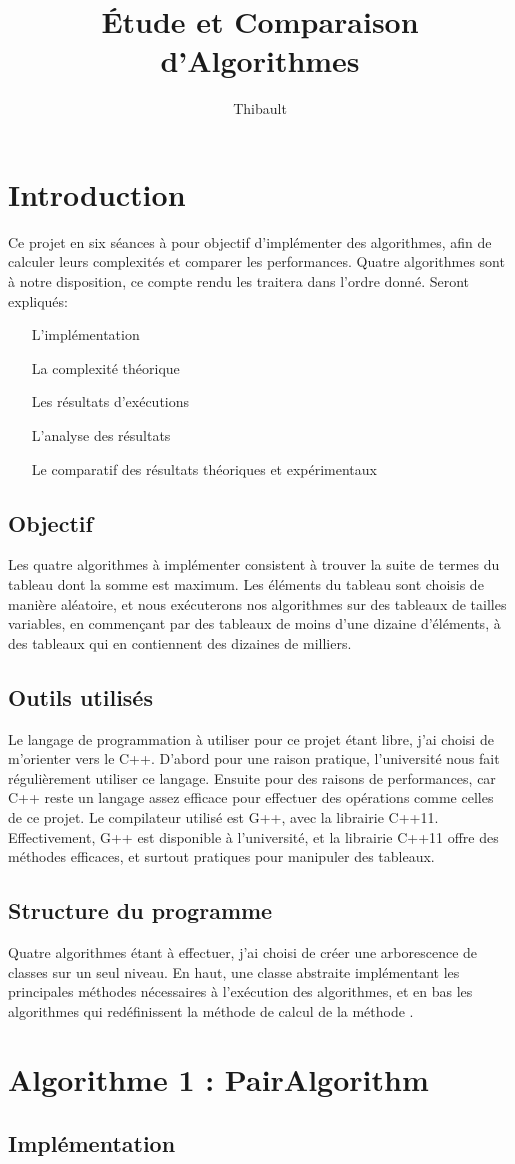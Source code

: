 \documentclass[a4paper, 12pt]{article}
\author{Thibault \bsc{BEZIERS LA FOSSE}}
\date{}
\title{Étude et Comparaison d'Algorithmes}
\begin{document}
\maketitle
\clearpage

\tableofcontents
\clearpage

\section{Introduction}
Ce projet en six séances à pour objectif d'implémenter des algorithmes, afin de calculer leurs complexités et comparer les performances. 
Quatre algorithmes sont à notre disposition, ce compte rendu les traitera dans l'ordre donné. Seront expliqués:
\begin{enumerate}
\item[L'implémentation]
\item[La complexité théorique]
\item[Les résultats d'exécutions]
\item[L'analyse des résultats]
\item[Le comparatif des résultats théoriques et expérimentaux]
\end{enumerate}
\subsection{Objectif}
Les quatre algorithmes à implémenter consistent à trouver la suite de termes du tableau dont la somme est maximum. 
Les éléments du tableau sont choisis de manière aléatoire, et nous exécuterons nos algorithmes sur des tableaux de tailles variables, en commençant par des tableaux de moins d'une dizaine d'éléments, à des tableaux qui en contiennent des dizaines de milliers.  
\subsection{Outils utilisés}
Le langage de programmation à utiliser pour ce projet étant libre, j'ai choisi de m'orienter vers le C++. D'abord pour une raison pratique, l'université nous fait régulièrement utiliser ce langage. Ensuite pour des raisons de performances, car C++ reste un langage assez efficace pour effectuer des opérations comme celles de ce projet.
Le compilateur utilisé est G++, avec la librairie C++11. Effectivement, G++ est disponible à l'université, et la librairie C++11 offre des méthodes efficaces, et surtout pratiques pour manipuler des tableaux. 
\subsection{Structure du programme}
Quatre algorithmes étant à effectuer, j'ai choisi de créer une arborescence de classes sur un seul niveau. En haut, une classe abstraite implémentant les principales méthodes nécessaires à l’exécution des algorithmes, et en bas les algorithmes qui redéfinissent la méthode de calcul de la méthode .
\section{Algorithme 1 : PairAlgorithm}
\subsection{Implémentation}
\end{document}
